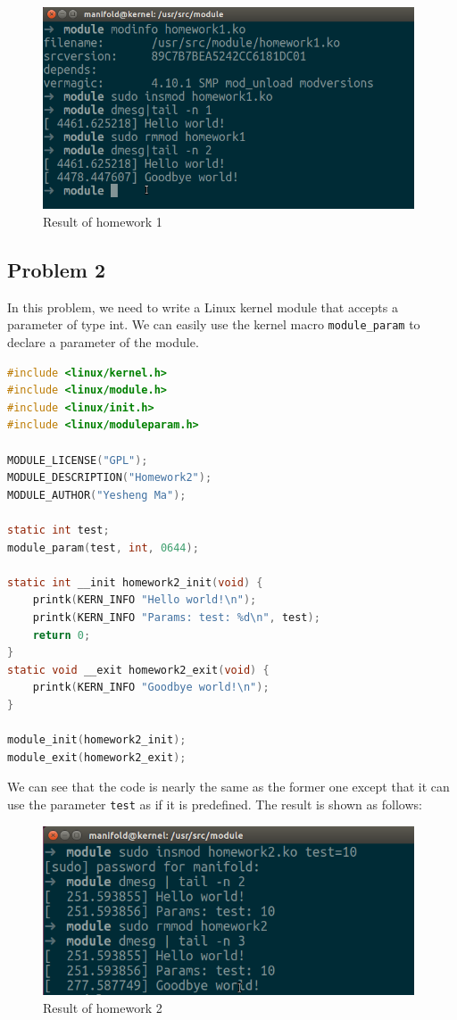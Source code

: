 \documentclass{article}
\begin{document}
\begin{figure}[H]
\centering
\includegraphics[width=11cm]{hw1res.png}
\caption{Result of homework 1}
\end{figure}

\subsection{Problem 2}
In this problem, we need to write a Linux kernel module that accepts a parameter of type int. We can easily use the kernel macro \texttt{module\_param} to declare a parameter of the module.
\begin{lstlisting}[language=c,caption=Module that takes an integer parameter]
#include <linux/kernel.h>
#include <linux/module.h>
#include <linux/init.h>
#include <linux/moduleparam.h>

MODULE_LICENSE("GPL");
MODULE_DESCRIPTION("Homework2");
MODULE_AUTHOR("Yesheng Ma");

static int test;
module_param(test, int, 0644);

static int __init homework2_init(void) {
    printk(KERN_INFO "Hello world!\n");
    printk(KERN_INFO "Params: test: %d\n", test);
    return 0;
}
static void __exit homework2_exit(void) {
    printk(KERN_INFO "Goodbye world!\n");
}

module_init(homework2_init);
module_exit(homework2_exit);
\end{lstlisting}

We can see that the code is nearly the same as the former one except that it can use the parameter \texttt{test} as if it is predefined. The result is shown as follows:
\begin{figure}[H]
\centering
\includegraphics[width=11cm]{hw2res.png}
\caption{Result of homework 2}
\end{figure}
\end{document}
